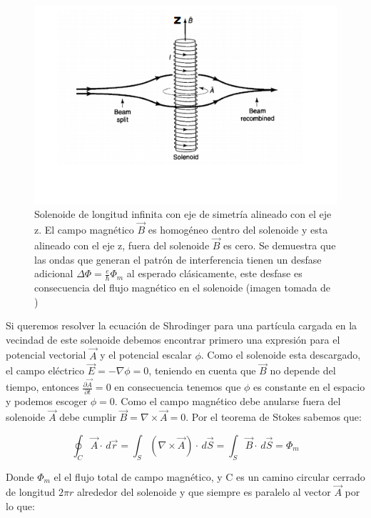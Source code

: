 \documentclass[12pt]{article}
\begin{document}
\begin{figure}[H]
\centering
\includegraphics[scale=1]{img/solenoide.png}
\caption{Solenoide de longitud infinita con eje de simetría alineado con el eje z. El campo magnético $\vec{B}$ es homogéneo dentro del solenoide y esta alineado con el eje z, fuera del solenoide $\vec{B}$ es cero. Se demuestra que las ondas que generan el patrón de interferencia tienen un desfase adicional $\Delta \Phi =\frac{e}{\hbar}\Phi_m$ al esperado clásicamente, este desfase es consecuencia del flujo magnético en el solenoide (imagen tomada de \cite{1})}
\end{figure}

Si queremos resolver la ecuación de Shrodinger para una partícula cargada en la vecindad de este solenoide debemos encontrar primero una expresión para el potencial vectorial $\vec{A}$ y el potencial escalar $\phi$. Como el solenoide esta descargado, el campo eléctrico $\vec{E}=-\nabla\phi=0$, teniendo en cuenta que $\vec{B}$ no depende del tiempo, entonces $\frac{\partial \vec{A}}{\partial t}=0$ en consecuencia tenemos que $\phi$ es constante en el espacio y podemos escoger $\phi=0$. Como el campo magnético debe anularse fuera del solenoide $\vec{A}$ debe cumplir $\vec{B}=\nabla\times\vec{A}=0$. Por el teorema de Stokes sabemos que:


\begin{equation}
\oint_C \vec{A}\cdot \,d\vec{r}=\int_S (\nabla \times \vec{A}) \cdot \, d\vec{S}=\int_S\vec{B} \cdot \, d\vec{S}=\Phi_m 
\end{equation}


Donde $\Phi_m$ el el flujo total de campo magnético, y C es un camino circular cerrado de longitud $2\pi r$ alrededor del solenoide y que siempre es paralelo al vector $\vec{A}$ por lo que:
\end{document}
